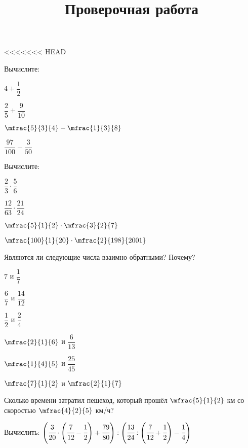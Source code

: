 %
%
%

%
%
%	
<<<<<<< HEAD
%
\begin{exam}
	\title{Проверочная работа}
	\begin{listofex}
		\item Вычислите:
		\begin{enumcols}[itemcolumns=4]
			\item \( 4+\dfrac{1}{2} \)
			\item \( \dfrac{2}{5}+\dfrac{9}{10} \)
			\item \( \mfrac{5}{3}{4}-\mfrac{1}{3}{8} \)
			\item \( \dfrac{97}{100}-\dfrac{3}{50} \)
		\end{enumcols}
		\item Вычислите:
		\begin{enumcols}[itemcolumns=4]
			\item \( \dfrac{2}{3}\cdot\dfrac{5}{6} \)
			\item \( \dfrac{12}{63}\cdot\dfrac{21}{24} \)
			\item \( \mfrac{5}{1}{2}\cdot\mfrac{3}{2}{7} \)
			\item \( \mfrac{100}{1}{20}\cdot\mfrac{2}{198}{2001} \)
		\end{enumcols}
			\item Являются ли следующие числа взаимно обратными? Почему?
			\begin{enumcols}[itemcolumns=6]
				\item \( 7 \) и \( \dfrac{1}{7} \)
				\item \( \dfrac{6}{7} \) и \( \dfrac{14}{12} \)
				\item \( \dfrac{1}{2} \) и \( \dfrac{2}{4} \)
				\item \( \mfrac{2}{1}{6} \) и \( \dfrac{6}{13} \)
				\item \( \mfrac{1}{4}{5} \) и \( \dfrac{25}{45} \)
				\item \( \mfrac{7}{1}{2} \) и \( \mfrac{2}{1}{7} \)
			\end{enumcols}			
			\item Сколько времени затратил пешеход, который прошёл \( \mfrac{5}{1}{2} \) км со скоростью \( \mfrac{4}{2}{5} \) км/ч?
			\item Вычислить: \( \left( \cfrac{3}{20}\cdot\left( \cfrac{7}{12}-\cfrac{1}{2} \right)+\cfrac{79}{80} \right):\left( \cfrac{13}{24}:\left( \cfrac{7}{12}+\cfrac{1}{2} \right)-\cfrac{1}{4} \right) \)
	\end{listofex}
\end{exam}
